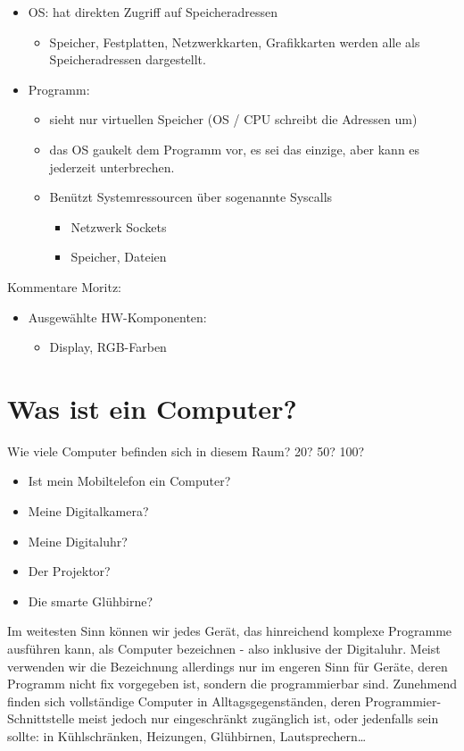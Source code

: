 {\begin{itemize}
\begin{itemize}
			\item OS: hat direkten Zugriff auf Speicheradressen
            \begin{itemize}
				\item Speicher, Festplatten, Netzwerkkarten, Grafikkarten werden alle als Speicheradressen dargestellt.
            \end{itemize}
			\item Programm:
            \begin{itemize}
				\item sieht nur virtuellen Speicher (OS / CPU schreibt die Adressen um)
				\item das OS gaukelt dem Programm vor, es sei das einzige, aber kann es jederzeit unterbrechen.
				\item Benützt Systemressourcen über sogenannte Syscalls
                \begin{itemize}
					\item Netzwerk Sockets
					\item Speicher, Dateien
                \end{itemize}
            \end{itemize}
        \end{itemize}
	\end{itemize}				
	Kommentare Moritz:
	\begin{itemize}
		\item Ausgewählte HW-Komponenten:
		\begin{itemize}
			\item Display, RGB-Farben
		\end{itemize}
	\end{itemize}
\newpage
}

\section{Was ist ein Computer?}
Wie viele Computer befinden sich in diesem Raum? 20? 50? 100?

\begin{itemize}
	\item Ist mein Mobiltelefon ein Computer?
	\item Meine Digitalkamera?
	\item Meine Digitaluhr?
	\item Der Projektor?
	\item Die smarte Glühbirne?
\end{itemize}

Im weitesten Sinn können wir jedes Gerät, das hinreichend komplexe Programme ausführen kann, als Computer bezeichnen - also inklusive der Digitaluhr. Meist verwenden wir die Bezeichnung allerdings nur im engeren Sinn für Geräte, deren Programm nicht fix vorgegeben ist, sondern die programmierbar sind. Zunehmend finden sich vollständige Computer in Alltagsgegenständen, deren Programmier-Schnittstelle meist jedoch nur eingeschränkt zugänglich ist, oder jedenfalls sein sollte: in Kühlschränken, Heizungen, Glühbirnen, Lautsprechern…

